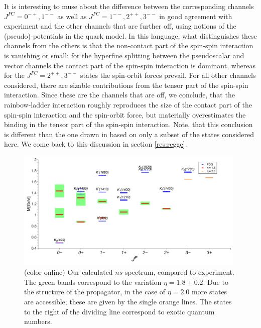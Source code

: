 It is interesting to muse about the difference between the corresponding channels $J^{PC}=0^{-+},1^{--}$
as well as $J^{PC}=1^{--},2^{++},3^{--}$ in good agreement with experiment and the other channels that 
are further off, using
notions of the (pseudo)-potentials in the quark model. In this language, what distinguishes these 
channels from the others is that the non-contact part of the spin-spin interaction 
is vanishing or small: for the hyperfine splitting between the pseudoscalar and vector 
channels the contact part of the spin-spin interaction is dominant, whereas for the $J^{PC}=2^{++},3^{--}$
states the spin-orbit forces prevail. For all other channels considered, there are sizable 
contributions from the tensor part of the spin-spin interaction. Since these are the channels
that are off, we conclude, that the rainbow-ladder interaction roughly reproduces the size of
the contact part of the spin-spin interaction and the spin-orbit force, but materially overestimates
the binding in the tensor part of the spin-spin interaction. Note, that this conclusion is 
different than the one drawn in \cite{Qin:2011xq} based on only a subset of the states considered here.  
We come back to this discussion in section \ref{res:regge}.
\begin{figure}[tp]
\begin{center}
\includegraphics[width=0.98\textwidth]{figures/spectrum_ns}
\caption{(color online) Our calculated $n\bar{s}$ spectrum, compared to experiment. The green bands 
correspond to the variation $\eta=1.8\pm0.2$. Due to the structure of the propagator, in the case 
of $\eta=2.0$ more states are accessible; these are given by the single orange lines. The states 
to the right of the dividing line correspond to exotic quantum numbers.
 }\label{fig:spectrumns}
\end{center}
\end{figure}

